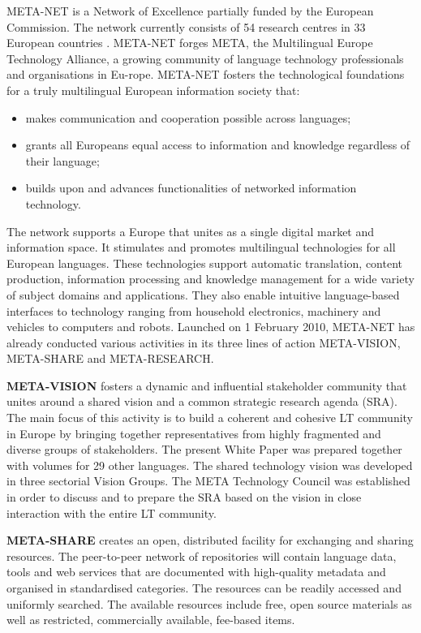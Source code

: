 \begin{multicols}{2}

  META-NET is a Network of Excellence partially funded by the European Commission. The network currently consists of 54 research centres in 33 European countries \cite{rehm2011}. META-NET forges META, the Multilingual Europe Technology Alliance, a growing community of language technology professionals and organisations in Eu-rope. META-NET fosters the technological foundations for a truly multilingual European information society that:

\begin{itemize}
\item makes communication and cooperation possible across languages;
\item grants all Europeans equal access to information and knowledge regardless of their language;
\item builds upon and advances functionalities of networked information technology.
\end{itemize}

The network supports a Europe that unites as a single digital market and information space. It stimulates and promotes multilingual technologies for all European languages. These technologies support automatic translation, content production, information processing and knowledge management for a wide variety of subject domains and applications. They also enable intuitive language-based interfaces to technology ranging from household electronics, machinery and vehicles to computers and robots.  Launched on 1 February 2010, META-NET has already conducted various activities in its three lines of action META-VISION, META-SHARE and META-RESEARCH.

\textbf{META-VISION} fosters a dynamic and influential stakeholder community that unites around a shared vision and a common strategic research agenda (SRA). The main focus of this activity is to build a coherent and cohesive LT community in Europe by bringing together representatives from highly fragmented and diverse groups of stakeholders. The present White Paper was prepared together with volumes for 29 other languages. The shared technology vision was developed in three sectorial Vision Groups. The META Technology Council was established in order to discuss and to prepare the SRA based on the vision in close interaction with the entire LT community.

\textbf{META-SHARE} creates an open, distributed facility for exchanging and sharing resources. The peer-to-peer network of repositories will contain language data, tools and web services that are documented with high-quality metadata and organised in standardised categories. The resources can be readily accessed and uniformly searched. The available resources include free, open source materials as well as restricted, commercially available, fee-based items.


\end{multicols}
